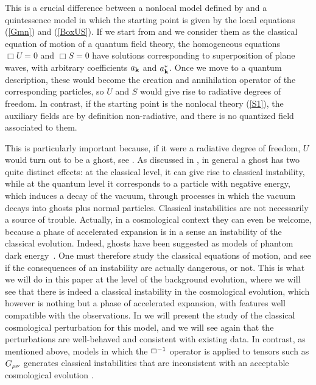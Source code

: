 \documentclass[aps,prd,twocolumn,superscriptaddress,nofootinbib]{revtex4}
\begin{document}
This is a crucial difference between a nonlocal model defined by  and a quintessence model in which the starting point is given by the local equations (\ref{Gmn}) and
(\ref{BoxUS}). If we start from  and we consider them as the classical  equation of motion of a quantum field theory, the homogeneous equations $\Box U=0$ and $\Box S=0$  have  solutions corresponding to  superposition of plane waves, with arbitrary coefficients $a_{{\bf k}}$ and $a^*_{{\bf k}}$.
Once we move to a quantum description, these would become the creation and annihilation operator of the corresponding particles, so $U$ and $S$ would give rise to radiative degrees of freedom. 
In contrast, if the starting point is the nonlocal theory (\ref{S1}), the auxiliary fields are by definition non-radiative, and there is no quantized field associated to them. 

This is  particularly important because, if it were a radiative degree of freedom,  $U$ would turn out to be a ghost, see \cite{Maggiore:2013mea,Foffa:2013sma}. As discussed in \cite{Foffa:2013sma},
in general a ghost has two quite distinct effects:  at the classical level, it can give rise to classical instability, while at the quantum level it corresponds to a particle with negative energy, which  induces a decay of the vacuum, through processes in which the vacuum decays into ghosts plus normal particles.
Classical instabilities are not necessarily a source of trouble. Actually, 
in  a cosmological context they can even be welcome,  because a phase of accelerated expansion is in a sense  an instability of the classical evolution. Indeed, ghosts have been suggested as models of phantom dark energy~\cite{Caldwell:1999ew,Carroll:2003st}. One must therefore study the classical equations of motion, and see if the consequences of an instability are actually dangerous, or not. This is what we will do in this paper at the level of the background evolution, where we will see that there is indeed a classical instability in the cosmological evolution, which however is nothing but a phase of accelerated expansion, with features well compatible with the observations. In \cite{Dirianetal} we will present the study of the classical cosmological perturbation for this model, and we will see again that the perturbations are well-behaved and consistent with existing data. In contrast, as mentioned above, models in which the $\Box^{-1}$ operator is applied to tensors such as $G_{\mu\nu}$ generates classical instabilities that are inconsistent with an acceptable cosmological evolution \cite{Maggiore:2013mea,Foffa:2013vma,Modesto:2013jea}.
\end{document}
